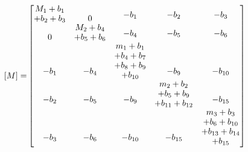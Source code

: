 \documentclass[12pt,a4paper]{article}
\begin{document}
\begin{equation}\label{Eq.mass_matrix_dimensional_combined}
\begin{aligned}
[M] =& 
\begin{bmatrix}
\shortstack[c]{$M_1 + b_1$ \\ $+ b_2 + b_3$} & 0 & \shortstack[c]{$-b_1$ \\ \,} & \shortstack[c]{$-b_2$ \\ \,} & \shortstack[c]{$-b_3$ \\ \,} \\
0 & \shortstack[c]{$M_2 + b_4$ \\ $+ b_5 + b_6$} & \shortstack[c]{$-b_4$ \\ \,} & \shortstack[c]{$-b_5$ \\ \,} & \shortstack[c]{$-b_6$ \\ \,} \\
\shortstack[c]{$-b_1$ \\ \,} & \shortstack[c]{$-b_4$ \\ \,} & \shortstack[c]{$m_1 + b_1$ \\ $+ b_4 + b_7$ \\ $+ b_8 + b_9$ \\ $+ b_{10}$} & \shortstack[c]{$-b_9$ \\ \,} & \shortstack[c]{$-b_{10}$ \\ \,} \\
\shortstack[c]{$-b_2$ \\ \,} & \shortstack[c]{$-b_5$ \\ \,} & \shortstack[c]{$-b_9$ \\ \,} & \shortstack[c]{$m_2 + b_2$ \\ $+ b_5 + b_9$ \\ $+ b_{11} + b_{12}$} & \shortstack[c]{$-b_{15}$ \\ \,} \\
\shortstack[c]{$-b_3$ \\ \,} & \shortstack[c]{$-b_6$ \\ \,} & \shortstack[c]{$-b_{10}$ \\ \,} & \shortstack[c]{$-b_{15}$ \\ \,} & \shortstack[c]{$m_3 + b_3$ \\ $+ b_6 + b_{10}$ \\ $+ b_{13} + b_{14}$ \\ $+ b_{15}$}
\end{bmatrix}
\end{aligned}
\end{equation}
\end{document}
